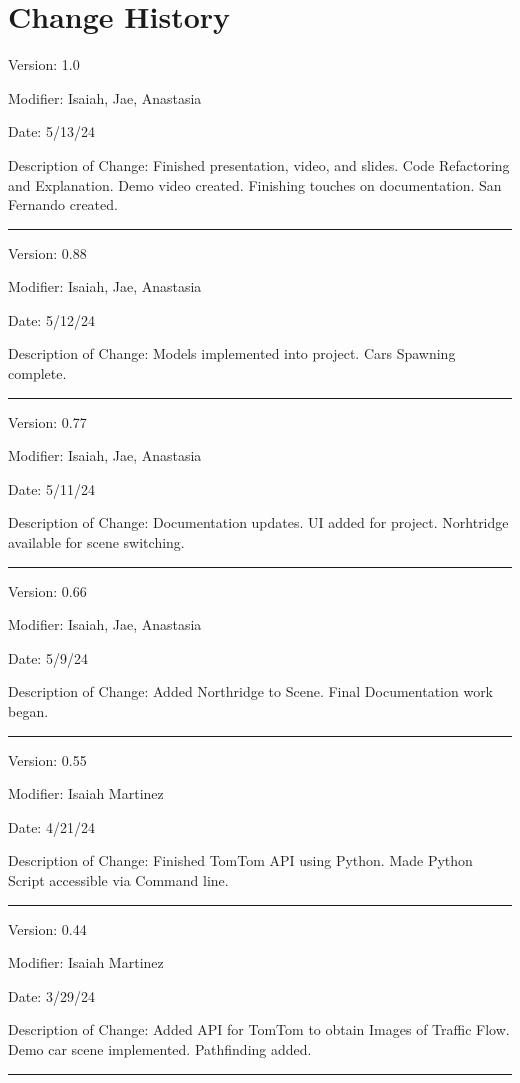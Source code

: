 \section{Change History}

Version: 1.0

Modifier: Isaiah, Jae, Anastasia 

Date: 5/13/24

Description of Change: Finished presentation, video, and slides.
Code Refactoring and Explanation.
Demo video created.
Finishing touches on documentation.
San Fernando created.

\noindent\rule{12cm}{0.4pt}

Version: 0.88

Modifier: Isaiah, Jae, Anastasia 

Date: 5/12/24

Description of Change: Models implemented into project.
Cars Spawning complete.

\noindent\rule{12cm}{0.4pt}

Version: 0.77

Modifier: Isaiah, Jae, Anastasia 

Date: 5/11/24

Description of Change: Documentation updates.
UI added for project.
Norhtridge available for scene switching.

\noindent\rule{12cm}{0.4pt}

Version: 0.66

Modifier: Isaiah, Jae, Anastasia 

Date: 5/9/24

Description of Change: Added Northridge to Scene.
Final Documentation work began.

\noindent\rule{12cm}{0.4pt}

Version: 0.55

Modifier: Isaiah Martinez

Date: 4/21/24

Description of Change: Finished TomTom API using Python.
Made Python Script accessible via Command line.

\noindent\rule{12cm}{0.4pt}

Version: 0.44

Modifier: Isaiah Martinez

Date: 3/29/24

Description of Change: Added API for TomTom to obtain Images of Traffic Flow.
Demo car scene implemented.
Pathfinding added.

\noindent\rule{12cm}{0.4pt}


